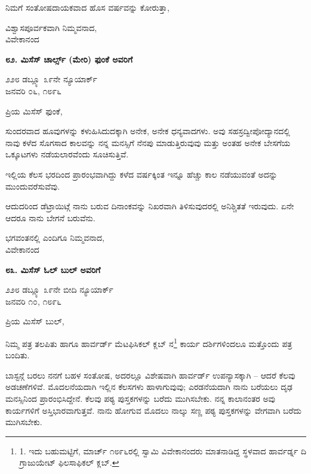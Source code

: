 ನಿಮಗೆ ಸಂತೋಷದಾಯಕವಾದ ಹೊಸ ವರ್ಷವನ್ನು ಕೋರುತ್ತಾ,

\begin{flushright}
ವಿಶ್ವಾಸಪೂರ್ವಕವಾಗಿ ನಿಮ್ಮವನಾದ,\\ವಿವೇಕಾನಂದ
\end{flushright}

\begin{center}
\textbf{೮೨. ಮಿಸೆಸ್ ಚಾರ್ಲ್ಸ್ (ಮೇರಿ) ಫುಂಕೆ ಅವರಿಗೆ}
\end{center}

\begin{flushright}
೨೨೮ ಡಬ್ಲ್ಯೂ ೩೯ನೇ ನ್ಯೂಯಾರ್ಕ್\\ಜನವರಿ ೦೬, ೧೮೯೬
\end{flushright}

ಪ್ರಿಯ ಮಿಸೆಸ್ ಫುಂಕೆ,

ಸುಂದರವಾದ ಹೂವುಗಳನ್ನು ಕಳುಹಿಸಿದುದಕ್ಕಾಗಿ ಅನೇಕ, ಅನೇಕ ಧನ್ಯವಾದಗಳು. ಅವು ಸಹಸ್ರದ್ವೀಪೋದ್ಯಾನದಲ್ಲಿ ನಾವು ಕಳೆದ ಸೊಗಸಾದ ಕಾಲವನ್ನು ನನ್ನ ಮನಸ್ಸಿಗೆ ನೆನಪು ಮಾಡುತ್ತಿರುವುವು ಮತ್ತು ಅಂತಹ ಅನೇಕ ಬೇಸಗೆಯ ಒಕ್ಕೂಟಗಳು ನಡೆಯಲಾರವೆಂದು ಸೂಚಿಸುತ್ತಿವೆ.

ಇಲ್ಲಿಯ ಕೆಲಸ ಭರದಿಂದ ಪ್ರಾರಂಭವಾಗಿದ್ದು ಕಳೆದ ವರ್ಷಕ್ಕಿಂತ ಇನ್ನೂ ಹೆಚ್ಚು ಕಾಲ ನಡೆಯುವಂತೆ ಅದನ್ನು ಮುಂದುವರೆಸುವೆವು.

ಆದುದರಿಂದ ಡೆಟ್ರಾಯಿಟ್ಗೆ ನಾನು ಬರುವ ದಿನಾಂಕವನ್ನು ನಿಖರವಾಗಿ ತಿಳಿಸುವುದರಲ್ಲಿ ಅನಿಶ್ಚಿತತೆ ಇರುವುದು. ಏನೇ ಆದರೂ ನಾನು ಬೇಗನೆ ಬರುವೆನು.

\begin{flushright}
ಭಗವಂತನಲ್ಲಿ ಎಂದಿಗೂ ನಿಮ್ಮವನಾದ,\\ವಿವೇಕಾನಂದ
\end{flushright}

\begin{center}
\textbf{೮೩. ಮಿಸೆಸ್ ಓಲ್ ಬುಲ್ ಅವರಿಗೆ}
\end{center}

\begin{flushright}
೨೨೮ ಡಬ್ಲ್ಯೂ ೩೯ನೇ ಬೀದಿ ನ್ಯೂಯಾರ್ಕ್\\ಜನವರಿ ೧೦, ೧೮೯೬
\end{flushright}

ಪ್ರಿಯ ಮಿಸೆಸ್ ಬುಲ್,

ನಿಮ್ಮ ಪತ್ರ ತಲಪಿತು ಹಾಗೂ ಹಾರ್ವರ್ಡ್ ಮೆಟಫಿಸಿಕಲ್ ಕ್ಲಬ್ ನ\footnote{1. ಇದು ಬಹುಮಟ್ಟಿಗೆ, ಮಾರ್ಚ್ ೧೮೯೬ರಲ್ಲಿ ಸ್ವಾಮಿ ವಿವೇಕಾನಂದರು ಮಾತನಾಡಿದ್ದ ಸ್ಥಳವಾದ ಹಾರ್ವರ್ಡ್ನ ದಿ ಗ್ರಾಜುಯೇಟ್ ಫಿಲಸಾಫಿಕಲ್ ಕ್ಲಬ್.} ಕಾರ್ಯ ದರ್ಶಿಗಳಿಂದಲೂ ಮತ್ತೊಂದು ಪತ್ರ ಬಂದಿತು.

ಬಾಸ್ಟನ್ಗೆ ಬರಲು ನನಗೆ ಬಹಳ ಸಂತೋಷ, ಅದರಲ್ಲೂ ವಿಶೇಷವಾಗಿ ಹಾರ್ವರ್ಡ್ ಉಪನ್ಯಾಸಕ್ಕಾಗಿ – ಆದರೆ ಕೆಲವು ಅಡಚಣೆಗಳಿವೆ. ಮೊದಲನೆಯದಾಗಿ ಇಲ್ಲಿನ ಕೆಲಸಗಳು ಹಾಳಾಗುವುವು; ಎರಡನೆಯದಾಗಿ ನಾನು ಬರೆಯಲು ದೃಢ ಮನಸ್ಸಿನಿಂದ ಪ್ರಾರಂಭಿಸಿದ್ದೇನೆ. ಕೆಲವು ಪಠ್ಯ ಪುಸ್ತಕಗಳನ್ನು ಬರೆದು ಮುಗಿಸಬೇಕು. ನನ್ನ ಕಾಲಾನಂತರ ಅವು ಕಾರ್ಯಗಳಿಗೆ ಅಸ್ತಿಭಾರವಾಗುತ್ತವೆ. ನಾನು ಹೋಗುವ ಮೊದಲು ನಾಲ್ಕು ಸಣ್ಣ ಪಠ್ಯ ಪುಸ್ತಕಗಳನ್ನು ವೇಗವಾಗಿ ಬರೆದು ಮುಗಿಸಬೇಕು.

